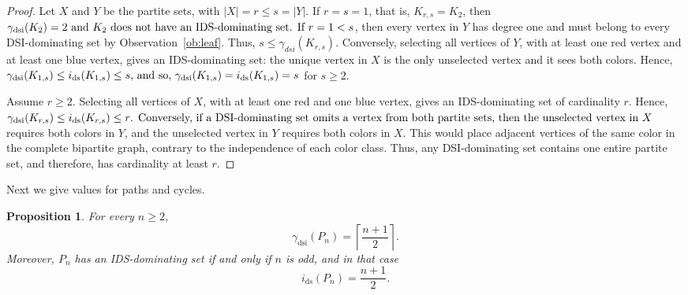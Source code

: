 \documentclass[11pt]{article}
\newtheorem{proposition}[theorem]{Proposition}
\theoremstyle{definition}
\theoremstyle{remark}
\newcommand{\ds}{\mathrm{ds}}
\newcommand{\dsi}{\mathrm{dsi}}
\begin{document}
\begin{proof}
Let \(X\) and \(Y\) be the partite sets, with \(|X|=r\le s=|Y|\).
If \(r=s=1\), that is,  \(K_{r,s}=K_2\), then \(\gamma_{\dsi}(K_2) = 2$ and $K_2$ does not have an IDS-dominating set.

If \(r=1<s\), then every vertex in
\(Y\) has degree one and must belong to every DSI-dominating set by Observation~\ref{ob:leaf}. Thus, $s \le \gamma_{dsi}(K_{r,s})$.  Conversely,
selecting all vertices of \(Y\), with at least one red vertex and at least
one blue vertex, gives an IDS-dominating set: the unique vertex in \(X\) is
the only unselected vertex and it sees both colors. Hence, \(\gamma_{\dsi}(K_{1,s}) \le i_{\ds}(K_{1,s}) \le s$, and so, 
\(\gamma_{\dsi}(K_{1,s})= i_{\ds}(K_{1,s}) = s\) for \(s\ge 2\).

Assume \(r\ge 2\). Selecting all vertices of \(X\), with at least one red and
one blue vertex, gives an IDS-dominating set of cardinality \(r\). Hence, \(\gamma_{\dsi}(K_{r,s}) \le i_{\ds}(K_{r,s}) \le r$.
Conversely,
if a DSI-dominating set omits a vertex from both partite sets, then the
unselected vertex in \(X\) requires both colors in \(Y\), and the unselected
vertex in \(Y\) requires both colors in \(X\). This would place adjacent
vertices of the same color in the complete bipartite graph, contrary to the
independence of each color class. Thus, any DSI-dominating set contains one
entire partite set, and therefore, has cardinality at least \(r\).
\end{proof}

Next we give values for paths and cycles. 

\begin{proposition}
\label{prop:path-values}
For every \(n\ge 2\),
\[
   \gamma_{\dsi}(P_n)=\left\lceil \frac{n+1}{2}\right\rceil.
\]
Moreover, \(P_n\) has an IDS-dominating set if and only if \(n\) is odd, and
in that case
\[
   i_{\ds}(P_n)=\frac{n+1}{2}.
\]
\end{proposition}
\end{document}
